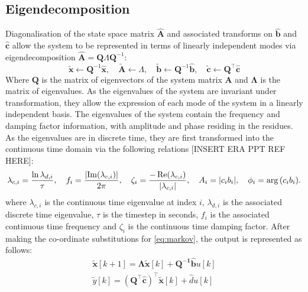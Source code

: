 \subsection{Eigendecomposition}
\label{sec:eigendecomposition}
Diagonalisation of the state space matrix $\hat{\mathbf{A}}$ and associated transforms on $\hat{\mathbf{b}}$ and $\hat{\mathbf{c}}$ allow the system to be represented in terms of linearly independent modes via eigendecomposition $\hat{\mathbf{A}} = \mathbf{Q} \Lambda \mathbf{Q}^{-1}$:
\begin{equation}
\label{eq:coord}
    \tilde{\mathbf{x}}       \leftarrow \mathbf{Q}^{-1}\mathbf{\hat{x}},
    \quad \tilde{\mathbf{A}} \leftarrow \Lambda,
    \quad \tilde{\mathbf{b}} \leftarrow \mathbf{Q}^{-1} \hat{\mathbf{b}},
    \quad \tilde{\mathbf{c}} \leftarrow \mathbf{Q}^{\top} \hat{\mathbf{c}}
\end{equation}
Where $\mathbf{Q}$ is the matrix of eigenvectors of the system matrix $\mathbf{A}$ and $\mathbf{\Lambda}$ is the matrix of eigenvalues. As the eigenvalues of the system are invariant under transformation, they allow the expression of each mode of the system in a linearly independent basis.
The eigenvalues of the system contain the frequency and damping factor information, with amplitude and phase residing in the residues. As the eigenvalues are in discrete time, they are first transformed into the continuous time domain via the following relations [INSERT ERA PPT REF HERE]:
\begin{equation}
\label{eq:era-parameters}
    \lambda_{c,i} = \frac{\ln \lambda_{d,i}}{\tau}, \quad 
    f_{i} = \frac{\abs{\Im(\lambda_{c,i})}}{2\pi}, \quad 
    \zeta_{i} = \frac{-\Re(\lambda_{c,i})}{\abs{\lambda_{c,i}}}, \quad
    A_{i} = |c_{i}b_{i}|, \quad
    \phi_{i} = \arg{(c_{i}b_{i})}.
\end{equation}
where $\lambda_{c,i}$ is the continuous time eigenvalue at index $i$, $\lambda_{d,i}$ is the associated discrete time eigenvalue, $\tau$ is the timestep in seconds, $f_{i}$ is the associated continuous time frequency and $\zeta_{i}$ is the continuous time damping factor.
After making the co-ordinate substitutions for \eqref{eq:markov}, the output is represented as follows:
\begin{align}
\label{eq:markov-eig}
    \mathbf{\tilde{x}}[k + 1] = \mathbf{\Lambda} \mathbf{ \tilde{x}}[k] + \mathbf{Q^{-1} \hat{b}}u[k]\\
    \tilde{y}[k] = \left( \mathbf{Q}^{\top} \hat{\mathbf{c}} \right)^{\top} \tilde{\mathbf{x}}[k] + \hat{d}u[k]
\end{align}
